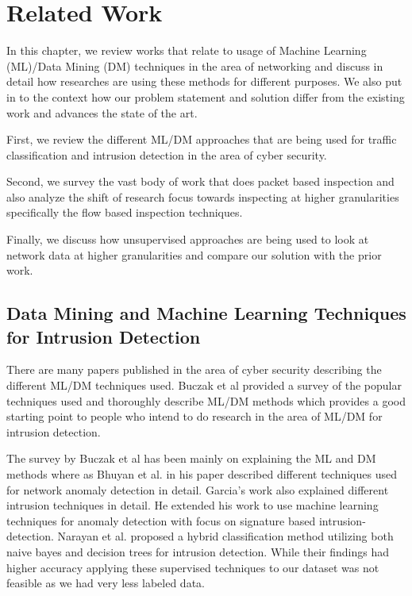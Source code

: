 
\chapter{Related Work}

In this chapter, we review works that relate to usage of Machine Learning (ML)/Data Mining (DM) techniques in the area of networking and discuss in detail how researches are using these methods for different purposes. We also put in to the context how our problem statement and solution differ from the existing work and advances the state of the art.

First, we review the different ML/DM approaches that are being used for traffic classification and intrusion detection in the area of cyber security.

Second, we survey the vast body of work that does packet based inspection and also analyze the shift of research focus towards inspecting at higher granularities specifically the flow based inspection techniques.

Finally, we discuss how unsupervised approaches are being used to look at network data at higher granularities and compare our solution with the prior work. 



\section{Data Mining and Machine Learning Techniques for Intrusion Detection}

There are many papers published in the area of cyber security describing the different ML/DM techniques used. Buczak et al \cite{buczak2016survey} provided a survey of  the popular techniques used and thoroughly describe ML/DM methods which provides a good starting point to people who intend to do research in the area of ML/DM for intrusion detection.

The survey by Buczak et al \cite{buczak2016survey} has been mainly on explaining the ML and DM methods where as Bhuyan et al. \cite{bhuyan2014network} in his paper described different techniques used for network anomaly detection in detail. Garcia's work \cite{garcia2009anomaly} also explained different intrusion techniques in detail. He extended his work to  use machine learning techniques for anomaly detection with focus on signature based intrusion-detection.
Narayan et al. \cite{peddabachigari2007modeling} proposed a hybrid classification method utilizing both naive bayes and decision trees for intrusion detection. While their findings had higher accuracy applying these supervised techniques to our dataset was not feasible as we had very less labeled data.

